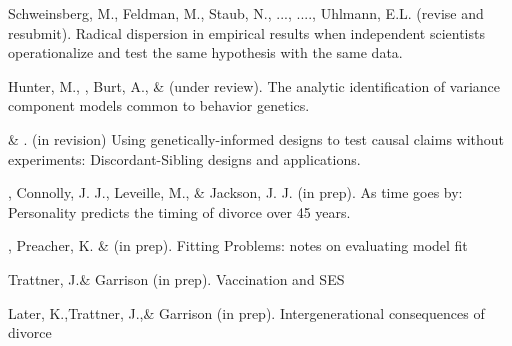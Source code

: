 \item Schweinsberg, M., Feldman, M., Staub, N., ..., \meb ...., Uhlmann, E.L. (revise and resubmit). Radical dispersion in empirical results when independent scientists operationalize and test the same hypothesis with the same data. 

\item Hunter, M., \meb, Burt, A., \& \joe (under review). The analytic identification of variance component models common to behavior genetics.


\item \meb \& \joe. (in revision) Using genetically-informed designs to test causal claims without experiments: Discordant-Sibling designs and applications. \href{https://osf.io/zpdwt/}{\small\color{blue}{osf.io/zpdwt/}}%

\item \meb, Connolly, J. J., Leveille, M., \& Jackson, J. J. (in prep). As time goes by: Personality predicts the timing of divorce over 45 years.%


\item \meb, Preacher, K. \& \joe(in prep). Fitting Problems: notes on evaluating model fit

\item Trattner, J.\notans \& Garrison (in prep). Vaccination and SES

\item Later, K.,\nota Trattner, J.,\nota \& Garrison (in prep). Intergenerational consequences of divorce



